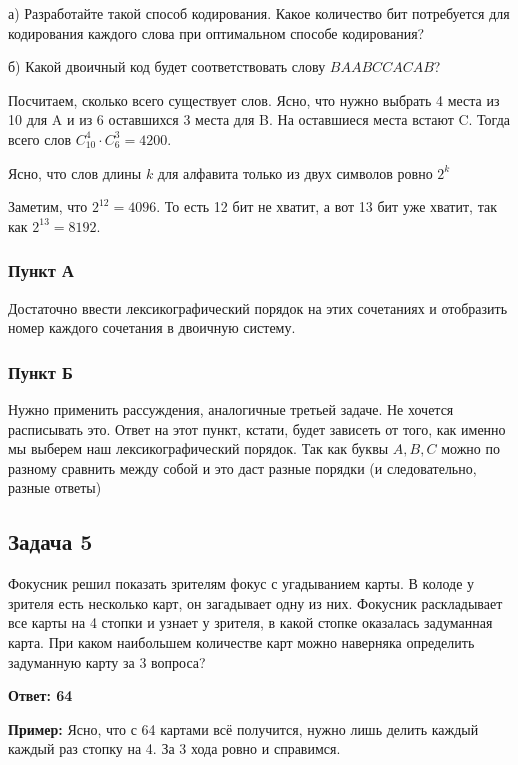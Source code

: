 а) Разработайте такой способ кодирования. Какое количество бит потребуется для
кодирования каждого слова при оптимальном способе кодирования?

б) Какой двоичный код будет соответствовать слову $BAABCCACAB$?

\begin{solution*}
Посчитаем, сколько всего существует слов. Ясно, что нужно выбрать 4 места из 10 для A и из 6 оставшихся 3 места для B. На оставшиеся места встают C. Тогда всего слов $C^4_{10} \cdot C^3_6 = 4200$.

Ясно, что слов длины $k$ для алфавита только из двух символов ровно $2^{k}$

Заметим, что $2^{12} = 4096$. То есть 12 бит не хватит, а вот 13 бит уже хватит, так как $2^{13} = 8192$.

\subsubsection{Пункт А}

Достаточно ввести лексикографический порядок на этих сочетаниях и отобразить номер каждого сочетания в двоичную систему.

\subsubsection{Пункт Б}

Нужно применить рассуждения, аналогичные третьей задаче. Не хочется расписывать это. Ответ на этот пункт, кстати, будет зависеть от того, как именно мы выберем наш лексикографический порядок. Так как буквы $A, B, C$ можно по разному сравнить между собой и это даст разные порядки (и следовательно, разные ответы)

\end{solution*}

\subsection{Задача 5}

Фокусник решил показать зрителям фокус с угадыванием карты. В колоде у зрителя
есть несколько карт, он загадывает одну из них. Фокусник раскладывает все карты на
4 стопки и узнает у зрителя, в какой стопке оказалась задуманная карта. При каком
наибольшем количестве карт можно наверняка определить задуманную карту за 3
вопроса?

\textbf{Ответ: 64}

\textbf{Пример:} Ясно, что с 64 картами всё получится, нужно лишь делить каждый каждый раз стопку на 4. За 3 хода ровно и справимся.

